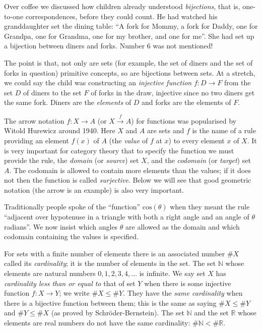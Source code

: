 \documentclass[a4paper,12pt]{article}
\theoremstyle{step}
\newcommand{\xra}{\xrightarrow}
\begin{document}
Over coffee we discussed how children already understood {\em bijections}, that is, one-to-one correspondences, before they could count. He had watched his granddaughter set the dining table: ``A fork for Mommy, a fork for Daddy, one for Grandpa, one for Grandma, one for my brother, and one for me''. She had set up a bijection between diners and forks.  
Number $6$ was not mentioned! 

The point is that, not only are sets (for example, the set of diners and the set of forks in question) primitive concepts, so are bijections between sets. At a stretch, we could say the child was constructing an {\em injective function} $f : D\to F$ from the set $D$ of diners to the set $F$ 
of forks in the draw, injective since no two diners get the same fork. Diners are the {\em elements}
of $D$ and forks are the elements of $F$. 

The arrow notation $f : X \to A$ (or $X\xra{f} A$) for functions was popularised by Witold Hurewicz around 1940.
Here $X$ and $A$ are sets and $f$ is the name of a rule providing an element $f(x)$ of $A$
(the {\em value} of $f$ at $x$) to every element $x$ of $X$.  
It is very important for category theory that to specify the function 
we must provide the rule, the {\em domain} (or {\em source}) set $X$, and the {\em codomain} (or {\em target}) set $A$. The codomain is allowed to contain more elements than the values; if it does not then the function is called {\em surjective}. Below we will see that good geometric notation (the arrow is an example) is also very important. 

Traditionally people spoke of the ``function'' $\mathrm{cos}(\theta)$ when they meant the rule ``adjacent over hypotenuse in a triangle with both a right angle and an angle of $\theta$ radians''.
We now insist which angles $\theta$ are allowed as the domain and which codomain containing the values is specified.   

For sets with a finite number of elements there is an associated number $\# X$ called its {\em cardinality}; it is the number of elements in the set. The set $\mathbb{N}$ whose elements are natural numbers $0, 1, 2, 3, 4, \dots$ is infinite. We say set $X$ has {\em cardinality less than or equal to} that
of set $Y$ when there is some injective function $f : X\to Y$; we write $\# X\le \# Y$. They have the {\em same cardinality} when there is a bijective function between them; this is the same as saying
$\# X\le \# Y$ and $\# Y\le \# X$ (as proved by Schr\"oder-Bernstein). The set $\mathbb{N}$ and the set $\mathbb{R}$ whose elements are real numbers do not have the same cardinality: $\# \mathbb{N}< \# \mathbb{R}$. 
\end{document}
